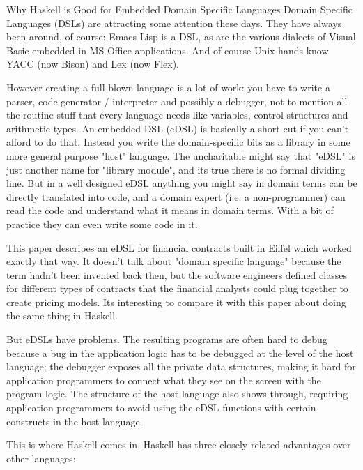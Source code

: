 \documentclass[proposal.tex]{subfiles}
\begin{document}
\begin{enumerate}
\begin{enumerate}
\end{enumerate}

 





Why Haskell is Good for Embedded Domain Specific Languages
Domain Specific Languages (DSLs) are attracting some attention these days. They have always been around, of course: Emacs Lisp is a DSL, as are the various dialects of Visual Basic embedded in MS Office applications. And of course Unix hands know YACC (now Bison) and Lex (now Flex).

However creating a full-blown language is a lot of work: you have to write a parser, code generator / interpreter and possibly a debugger, not to mention all the routine stuff that every language needs like variables, control structures and arithmetic types. An embedded DSL (eDSL) is basically a short cut if you can't afford to do that. Instead you write the domain-specific bits as a library in some more general purpose "host" language. The uncharitable might say that "eDSL" is just another name for "library module", and its true there is no formal dividing line. But in a well designed eDSL anything you might say in domain terms can be directly translated into code, and a domain expert (i.e. a non-programmer) can read the code and understand what it means in domain terms. With a bit of practice they can even write some code in it.

This paper describes an eDSL for financial contracts built in Eiffel which worked exactly that way. It doesn't talk about "domain specific language" because the term hadn't been invented back then, but the software engineers defined classes for different types of contracts that the financial analysts could plug together to create pricing models. Its interesting to compare it with this paper about doing the same thing in Haskell.

But eDSLs have problems. The resulting programs are often hard to debug because a bug in the application logic has to be debugged at the level of the host language; the debugger exposes all the private data structures, making it hard for application programmers to connect what they see on the screen with the program logic. The structure of the host language also shows through, requiring application programmers to avoid using the eDSL functions with certain constructs in the host language.

This is where Haskell comes in. Haskell has three closely related advantages over other languages:



\end{enumerate}
\end{document}

